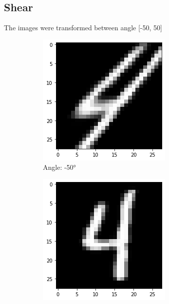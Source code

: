 \subsection{Shear}  
The images were transformed between angle [-50, 50]
    \begin{figure}[!htbp]
        \centering
        \begin{subfigure}[b]{.3\textwidth}
            \includegraphics[width=\linewidth]{images/shear1.png}
            \caption{Angle: \ang{-50}}
            \label{fig:Rotate-misclass0}
        \end{subfigure}%
        \begin{subfigure}[b]{.3\textwidth}
            \includegraphics[width=\textwidth]{images/shear2.png}

\end{subfigure}
\end{figure}
